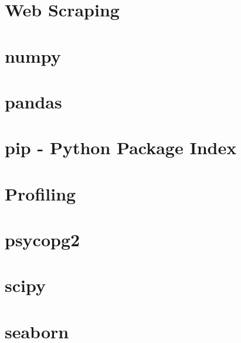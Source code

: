 \documentclass{article}
\begin{document}
%

\section{Web Scraping}


\section{numpy}


\section{pandas}


\section{pip - Python Package Index}


\section{Profiling}


\section{psycopg2}

\section{scipy}

\section{seaborn}


\newpage

%

\end{document}
